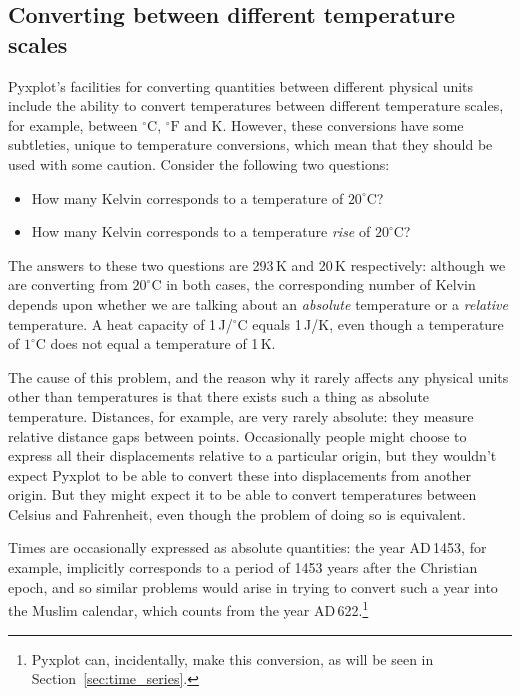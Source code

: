 \subsection{Converting between different temperature scales}

Pyxplot's facilities for converting quantities between different physical units
include the ability to convert temperatures between different temperature
scales, for example, between $^\circ\mathrm{C}$, $^\circ\mathrm{F}$ and K.
However, these conversions have some subtleties, unique to temperature
conversions, which mean that they should be used with some caution. Consider
the following two questions:
\begin{itemize}
\item How many Kelvin corresponds to a temperature of $20^\circ$C?
\item How many Kelvin corresponds to a temperature {\it rise} of $20^\circ$C?
\end{itemize}
The answers to these two questions are 293\,K and 20\,K respectively: although
we are converting from $20^\circ$C in both cases, the corresponding number of
Kelvin depends upon whether we are talking about an {\it absolute} temperature
or a {\it relative} temperature. A heat capacity of 1\,J/$^\circ$C equals
1\,J/K, even though a temperature of $1^\circ$C does not equal a temperature of
1\,K.

The cause of this problem, and the reason why it rarely affects any physical
units other than temperatures is that there exists such a thing as absolute
temperature. Distances, for example, are very rarely absolute: they measure
relative distance gaps between points. Occasionally people might choose to
express all their displacements relative to a particular origin, but they
wouldn't expect Pyxplot to be able to convert these into displacements from
another origin. But they might expect it to be able to convert temperatures
between Celsius and Fahrenheit, even though the problem of doing so is
equivalent.

Times are occasionally expressed as absolute quantities: the year
{\footnotesize AD}\,1453, for example, implicitly corresponds to a period of
1453 years after the Christian epoch, and so similar problems would arise in
trying to convert such a year into the Muslim calendar, which counts from the
year {\footnotesize AD}\,622.\footnote{Pyxplot can, incidentally, make this
conversion, as will be seen in Section~\ref{sec:time_series}.}

